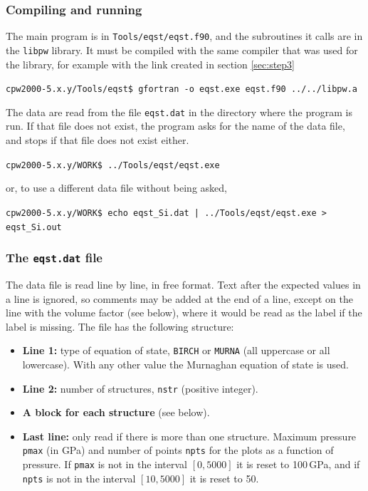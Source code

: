 \documentclass[11pt]{article}
\begin{document}
\subsubsection{Compiling and running}

The main program is in \texttt{Tools/eqst/eqst.f90}, and the subroutines it calls
are in the \texttt{libpw} library.  It must be compiled with the same compiler
that was used for the library, for example with the link created in
section \ref{sec:step3}

\noindent\texttt{cpw2000-5.x.y/Tools/eqst\$ gfortran -o eqst.exe eqst.f90 ../../libpw.a}

The data are read from the file \texttt{eqst.dat} in the directory where
the program is run.  If that file does not exist, the program asks for the
name of the data file, and stops if that file does not exist either.

\noindent\texttt{cpw2000-5.x.y/WORK\$ ../Tools/eqst/eqst.exe}

or, to use a different data file without being asked,

\noindent\texttt{cpw2000-5.x.y/WORK\$ echo eqst\_Si.dat | ../Tools/eqst/eqst.exe > eqst\_Si.out}

\subsubsection{The \texttt{eqst.dat} file}

The data file is read line by line, in free format.
Text after the expected values in a line is ignored, so comments may be added at the end
of a line, except on the line with the volume factor (see below), where it would be
read as the label if the label is missing.
The file has the following structure:

\begin{itemize}

\item[] \textbf{Line 1:} type of equation of state, \texttt{BIRCH} or \texttt{MURNA}
  (all uppercase or all lowercase).
  With any other value the Murnaghan equation of state is used.

\item[] \textbf{Line 2:} number of structures, \texttt{nstr} (positive integer).

\item[] \textbf{A block for each structure} (see below).

\item[] \textbf{Last line:} only read if there is more than one structure.
  Maximum pressure \texttt{pmax} (in GPa) and number of points \texttt{npts}
  for the plots as a function of pressure.
  If \texttt{pmax} is not in the interval $[0,5000]$ it is reset to 100\,GPa,
  and if \texttt{npts} is not in the interval $[10,5000]$ it is reset to 50.

\end{itemize}
\end{document}
